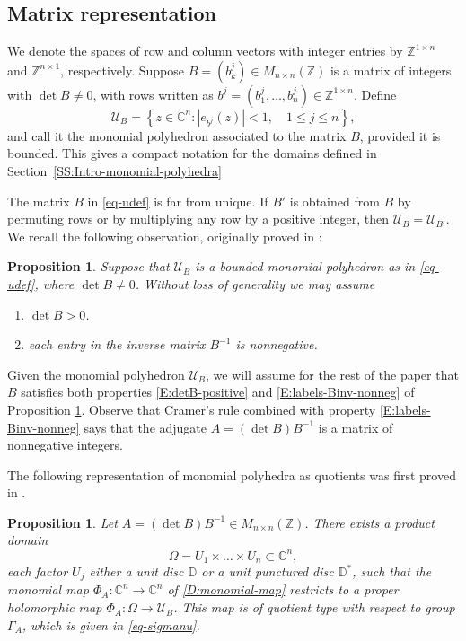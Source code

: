 \documentclass[letterpaper,11pt,reqno]{amsart}
\theoremstyle{plain}
\newtheorem{proposition}[equation]{Proposition}
\theoremstyle{definition}
\theoremstyle{remark}
\theoremstyle{remark}
\numberwithin{equation}{section}
\newcommand{\cx}{{\mathbb C}}
\newcommand{\C}{{\mathbb C}}
\newcommand{\D}{{\mathbb D}}
\newcommand{\Z}{{\mathbb Z}}
\newcommand{\Uu}{\mathscr{U}}
\begin{document}
\subsection{Matrix representation}\label{SS:matrix-representation}

We denote the spaces of  row and column vectors with integer entries by $\Z^{1 \times n}$ and $\Z^{n \times 1}$, respectively. 
Suppose $B = (b_k^j ) \in M_{n \times n}(\Z)$ is a matrix of integers with $\det B\not=0$, with rows written as $b^j = (b^j_1,\dots, b^j_n) \in \Z^{1 \times n}$. 
Define 
\begin{equation}\label{eq-udef}
\mathscr{U}_B = \left\{z\in\cx^n:  |e_{b^j}(z)|  < 1, \quad 1\leq j \leq n  \right\},
\end{equation}
and call it the  monomial polyhedron associated to the matrix $B$, provided it is bounded.
This gives a compact notation for the domains  defined in Section~\ref{SS:Intro-monomial-polyhedra}

The matrix $B$ in \eqref{eq-udef} is far from unique. 
If $B'$ is obtained from $B$ by permuting rows or by multiplying any row by a positive integer, then $\Uu_B=\Uu_{B'}$. 
We recall the following observation, originally proved in \cite[Proposition~3.2]{bcem}:
\begin{proposition}\label{P:ConditionsOnMatrixB}
Suppose that $\Uu_B$ is a bounded monomial polyhedron as in \eqref{eq-udef}, where $\det B \neq 0 $.  
Without loss of generality we may assume
\begin{enumerate}
\item $\det{B} > 0$. \label{E:detB-positive}
\item each entry in the inverse matrix $B^{-1}$ is nonnegative. \label{E:labels-Binv-nonneg}
\end{enumerate}
\end{proposition}

Given the monomial polyhedron $\Uu_B$, we will assume for the rest of the paper that $B$ satisfies both properties \eqref{E:detB-positive} and \eqref{E:labels-Binv-nonneg} of Proposition \ref{P:ConditionsOnMatrixB}.
Observe that Cramer's rule combined with property \eqref{E:labels-Binv-nonneg} says that the adjugate $A = (\det B) B^{-1}$ is a matrix of nonnegative integers.

The following representation of monomial polyhedra as quotients was first proved in \cite[Theorem~3.12]{bcem}.

\begin{proposition}\label{P:covering-mono-polyh}
Let  $A = (\det B) B^{-1}\in M_{n \times n}(\Z)$. 
There exists a product domain 
\begin{equation}\label{eq-Omegaproduct}
\Omega = U_1 \times \dots \times U_n \subset \C^n,
\end{equation}
each factor $U_j$ either a unit disc $\D$ or a unit punctured disc $\D^*$, such that the monomial map $\Phi_{A}: \C^n \to \C^n$ of \eqref{D:monomial-map} restricts to a proper holomorphic  map $\Phi_A:\Omega \to \Uu_B$.  
This map is of quotient type with respect to group $\Gamma_A$, which is given in \eqref{eq-sigmanu}.
\end{proposition}
\end{document}
